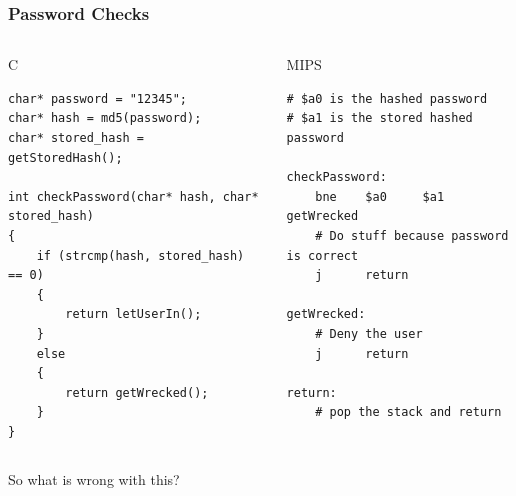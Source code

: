 \documentclass{beamer}
\begin{document}
\begin{frame}[fragile]
\frametitle{Password Checks}{\vspace{-3em}}
\begin{columns}[t]
\begin{column}{0.5\textwidth}
\begin{center}C\end{center}
\begin{lstlisting}
char* password = "12345";
char* hash = md5(password);
char* stored_hash = getStoredHash();

int checkPassword(char* hash, char* stored_hash)
{
    if (strcmp(hash, stored_hash) == 0)
    {
        return letUserIn();
    }
    else
    {
        return getWrecked();
    }
}
\end{lstlisting}
\end{column}

\begin{column}{0.5\textwidth}
\begin{center}MIPS\end{center}
\begin{lstlisting}[language={}]
# $a0 is the hashed password
# $a1 is the stored hashed password

checkPassword:
    bne    $a0     $a1    getWrecked
    # Do stuff because password is correct
    j      return

getWrecked:
    # Deny the user
    j      return

return:
    # pop the stack and return
\end{lstlisting}
\end{column}

\end{columns}
\end{frame}

\begin{frame}
    \begin{center}So what is wrong with this?\end{center}
\end{frame}
\end{document}
